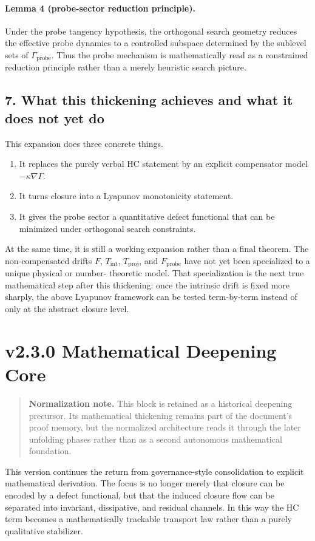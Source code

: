 \paragraph{Lemma 4 (probe-sector reduction principle).}
Under the probe tangency hypothesis, the orthogonal search geometry reduces the
effective probe dynamics to a controlled subspace determined by the sublevel
sets of $\Gamma_{\mathrm{probe}}$. Thus the probe mechanism is mathematically read
as a constrained reduction principle rather than a merely heuristic search
picture.

\subsection*{7. What this thickening achieves and what it does not yet do}
This expansion does three concrete things.
\begin{enumerate}
    \item It replaces the purely verbal HC statement by an explicit compensator
    model $-\kappa\nabla\Gamma$.
    \item It turns closure into a Lyapunov monotonicity statement.
    \item It gives the probe sector a quantitative defect functional that can be
    minimized under orthogonal search constraints.
\end{enumerate}
At the same time, it is still a working expansion rather than a final theorem.
The non-compensated drifts $F$, $T_{\mathrm{int}}$, $T_{\mathrm{proj}}$, and
$F_{\mathrm{probe}}$ have not yet been specialized to a unique physical or number-
theoretic model. That specialization is the next true mathematical step after
this thickening: once the intrinsic drift is fixed more sharply, the above
Lyapunov framework can be tested term-by-term instead of only at the abstract
closure level.


\section*{v2.3.0 Mathematical Deepening Core}
\begin{quote}
\textbf{Normalization note.} This block is retained as a historical deepening precursor. Its mathematical thickening remains part of the document's proof memory, but the normalized architecture reads it through the later unfolding phases rather than as a second autonomous mathematical foundation.
\end{quote}

This version continues the return from governance-style consolidation to
explicit mathematical derivation. The focus is no longer merely that closure can
be encoded by a defect functional, but that the induced closure flow can be
separated into invariant, dissipative, and residual channels. In this way the
HC term becomes a mathematically trackable transport law rather than a purely
qualitative stabilizer.

